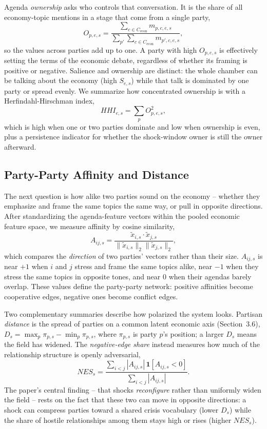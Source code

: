 \documentclass[11pt]{article}
\begin{document}
Agenda \emph{ownership} asks who controls that conversation. It is the share of all economy-topic mentions in a stage that come from a single party,
\begin{equation}
O_{p,e,s} =
\frac{\sum_{c \in C_{\text{econ}}} m_{p,c,e,s}}
{\sum_{p'} \sum_{c \in C_{\text{econ}}} m_{p',c,e,s}},
\end{equation}
so the values across parties add up to one. A party with high $O_{p,e,s}$ is effectively setting the terms of the economic debate, regardless of whether its framing is positive or negative. Salience and ownership are distinct: the whole chamber can be talking about the economy (high $S_{e,s}$) while that talk is dominated by one party or spread evenly. We summarize how concentrated ownership is with a Herfindahl-Hirschman index,
\begin{equation}
HHI_{e,s} = \sum_p O_{p,e,s}^2,
\end{equation}
which is high when one or two parties dominate and low when ownership is even, plus a persistence indicator for whether the shock-window owner is still the owner afterward.

\subsection{Party-Party Affinity and Distance}
The next question is how alike two parties sound on the economy -- whether they emphasize and frame the same topics the same way, or pull in opposite directions. After standardizing the agenda-feature vectors within the pooled economic feature space, we measure affinity by cosine similarity,
\begin{equation}
A_{ij,s} =
\frac{\tilde{x}_{i,s}\cdot\tilde{x}_{j,s}}
{\|\tilde{x}_{i,s}\|_2 \|\tilde{x}_{j,s}\|_2},
\end{equation}
which compares the \emph{direction} of two parties' vectors rather than their size. $A_{ij,s}$ is near $+1$ when $i$ and $j$ stress and frame the same topics alike, near $-1$ when they stress the same topics in opposite tones, and near 0 when their agendas barely overlap. These values define the party-party network: positive affinities become cooperative edges, negative ones become conflict edges.

Two complementary summaries describe how polarized the system looks. Partisan \emph{distance} is the spread of parties on a common latent economic axis (Section~3.6), $D_s = \max_p \pi_{p,s} - \min_p \pi_{p,s}$, where $\pi_{p,s}$ is party $p$'s position; a larger $D_s$ means the field has widened. The \emph{negative-edge share} instead measures how much of the relationship structure is openly adversarial,
\begin{equation}
NES_s =
\frac{\sum_{i<j} |A_{ij,s}|\, \mathbf{1}[A_{ij,s}<0]}
{\sum_{i<j} |A_{ij,s}|}.
\end{equation}
The paper's central finding -- that shocks \emph{reconfigure} rather than uniformly widen the field -- rests on the fact that these two can move in opposite directions: a shock can compress parties toward a shared crisis vocabulary (lower $D_s$) while the share of hostile relationships among them stays high or rises (higher $NES_s$).
\end{document}

